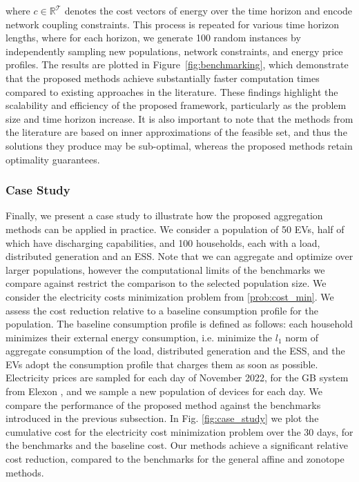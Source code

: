 where $c\in \mathbb{R}^\mathcal{T}$ denotes the cost vectors of energy over the time horizon and encode network coupling constraints.
This process is repeated for various time horizon lengths, where for each horizon, we generate 100 random instances by independently sampling new populations, network constraints, and energy price profiles. 
The results are plotted in Figure~\ref{fig:benchmarking}, which demonstrate that the proposed methods achieve substantially faster computation times compared to existing approaches in the literature. These findings highlight the scalability and efficiency of the proposed framework, particularly as the problem size and time horizon increase. It is also important to note that the methods from the literature are based on inner approximations of the feasible set, and thus the solutions they produce may be sub-optimal, whereas the proposed methods retain optimality guarantees.


\subsubsection{Case Study}
Finally, we present a case study to illustrate how the proposed aggregation methods can be applied in practice. We consider a population of 50 EVs, half of which have discharging capabilities, and 100 households, each with a load, distributed generation and an ESS. Note that we can aggregate and optimize over larger populations, however the computational limits of the benchmarks we compare against restrict the comparison to the selected population size.
We consider the electricity costs minimization problem from \eqref{prob:cost_min}.
We assess the cost reduction relative to a baseline consumption profile for the population. The baseline consumption profile is defined as follows: each household minimizes their external energy consumption, i.e. minimize the $l_1$ norm of aggregate consumption of the load, distributed generation and the ESS, and the EVs adopt the consumption profile that charges them as soon as possible.
Electricity prices are sampled for each day of November 2022, for the GB system from Elexon \cite{ElexonPortal}, and we sample a new population of devices for each day. 
We compare the performance of the proposed method against the benchmarks introduced in the previous subsection.
In Fig. \ref{fig:case_study} we plot the cumulative cost for the electricity cost minimization problem over the 30 days, for the benchmarks and the baseline cost. Our methods achieve a significant relative cost reduction, compared to the benchmarks for the general affine and zonotope methods.

